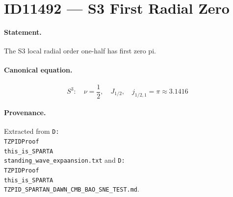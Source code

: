 \section*{ID11492 --- S3 First Radial Zero}

\paragraph{Statement.}
The S3 local radial order one-half has first zero pi.

\paragraph{Canonical equation.}
\[
S^3:\quad\nu=\frac12,\quad J_{1/2},\quad j_{1/2,1}=\pi\approx3.1416
\]

\paragraph{Provenance.}
Extracted from \texttt{D:\\TZPIDProof\\this\_is\_SPARTA\\standing\_wave\_expaansion.txt} and \texttt{D:\\TZPIDProof\\this\_is\_SPARTA\\TZPID\_SPARTAN\_DAWN\_CMB\_BAO\_SNE\_TEST.md}.
